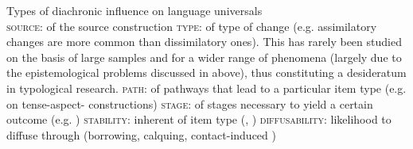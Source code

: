 \documentclass[output=paper]{langsci/langscibook}
\begin{document}
\ea
Types of diachronic influence on language universals\\
  \ea \textsc{source}:  of the source construction 
  \ex \textsc{type}:  of type of change (e.g. assimilatory changes are more common than dissimilatory ones). This has rarely been studied on the basis of large samples and for a wider range of phenomena (largely due to the epistemological problems discussed in  above), thus constituting a desideratum in typological research.
  \ex \textsc{path}:  of pathways that lead to a particular item type (e.g. \citealt{BybeeEtAl1994} on tense-aspect- constructions)
  \ex \textsc{stage}:  of stages necessary to yield a certain outcome (e.g. \citealt{Harris2008})
  \ex \textsc{stability}: inherent  of item type (\citealt{Greenberg1978_Diachr}, \citealt{Nichols2003}) 
  \ex \textsc{diffusability:} likelihood to diffuse through  (borrowing, calquing, contact-induced )
  \z
\z
\end{document}
